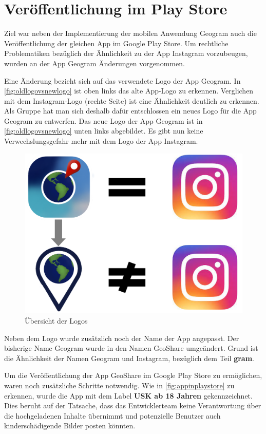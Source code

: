 \chapter{Veröffentlichung im Play Store\label{chap5:Fuenftes-Kapitel}}

Ziel war neben der Implementierung der mobilen Anwendung \glqq Geogram\grqq{} auch die Veröffentlichung der gleichen App im Google Play Store. Um rechtliche Problematiken bezüglich der Ähnlichkeit zu der App \glqq Instagram\grqq{} vorzubeugen, wurden an der App \glqq Geogram\grqq{} Änderungen vorgenommen.

Eine Änderung bezieht sich auf das verwendete Logo der App \glqq Geogram\grqq{}. In \autoref{fig:oldlogovsnewlogo} ist oben links das alte App-Logo zu erkennen. Verglichen mit dem Instagram-Logo (rechte Seite) ist eine Ähnlichkeit deutlich zu erkennen. Als Gruppe hat man sich deshalb dafür entschlossen ein neues Logo für die App \glqq Geogram\grqq{} zu entwerfen. Das neue Logo der App \glqq Geogram\grqq{} ist in \autoref{fig:oldlogovsnewlogo} unten links abgebildet. Es gibt nun keine Verwechslungsgefahr mehr mit dem Logo der App \glqq Instagram\grqq{}.

\begin{figure}[H]
    \centering
    \includegraphics[width=0.8\linewidth]{images/logovsinsta.png}
    \caption{Übersicht der Logos}
    \label{fig:oldlogovsnewlogo}
\end{figure}

Neben dem Logo wurde zusätzlich noch der Name der App angepasst. Der bisherige Name \glqq Geogram\grqq{} wurde in den Namen \glqq GeoShare\grqq{} umgeändert. Grund ist die Ähnlichkeit der Namen \glqq Geogram\grqq{} und \glqq Instagram\grqq{}, bezüglich dem Teil \glqq \textbf{gram}\grqq{}.

Um die Veröffentlichung der App \glqq GeoShare\grqq{} im Google Play Store zu ermöglichen, waren noch zusätzliche Schritte notwendig. Wie in \autoref{fig:appinplaystore} zu erkennen, wurde die App mit dem Label \glqq \textbf{USK ab 18 Jahren}\grqq{} gekennzeichnet. Dies beruht auf der Tatsache, dass das Entwicklerteam keine Verantwortung über die hochgeladenen Inhalte übernimmt und potenzielle Benutzer auch kinderschädigende Bilder posten könnten.

